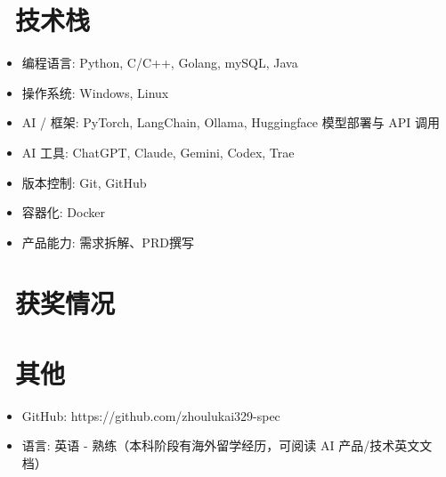 \documentclass{resume}
\begin{document}

\section{\texorpdfstring{{\normalfont\faCogs}\ }{}技术栈}
\begin{itemize}[parsep=0.5ex]
  \item 编程语言: Python, C/C++, Golang, mySQL, Java
  \item 操作系统: Windows, Linux
  \item AI / 框架: PyTorch, LangChain, Ollama, Huggingface 模型部署与 API 调用
  \item AI 工具: ChatGPT, Claude, Gemini, Codex, Trae
  \item 版本控制: Git, GitHub
  \item 容器化: Docker
  \item 产品能力: 需求拆解、PRD撰写
\end{itemize}

\section{\texorpdfstring{{\normalfont\faHeartO}\ }{}获奖情况}

\section{\texorpdfstring{{\normalfont\faInfo}\ }{}其他}
\begin{itemize}[parsep=0.5ex]
  \item GitHub: https://github.com/zhoulukai329-spec
  \item 语言: 英语 - 熟练（本科阶段有海外留学经历，可阅读 AI 产品/技术英文文档）
\end{itemize}

%
%
\end{document}
